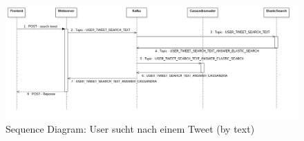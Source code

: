\begin{figure}[H]
	\includegraphics[width=\textwidth]{pics/useCases/SearchTweet}
	\caption{Sequence Diagram: User sucht nach einem Tweet (by text)}
\end{figure}